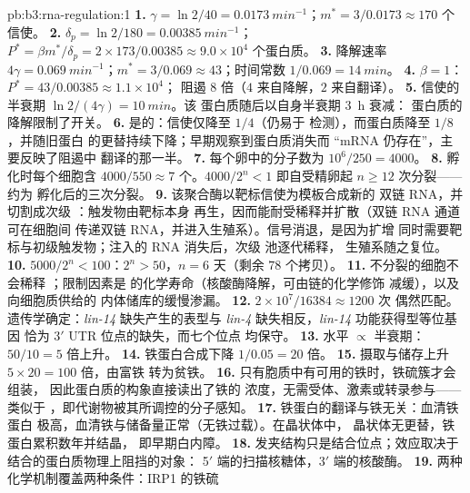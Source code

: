 \begin{solution}{pb:b3:rna-regulation:1}
\textbf{1.} $\gamma = \ln 2/40 = \qty{0.0173}{min^{-1}}$；$m^{*} =
3/0.0173 \approx 170$ 个信使。
\textbf{2.} $\delta_{p} = \ln 2/180 = \qty{0.00385}{min^{-1}}$；$P^{*} =
\beta m^{*}/\delta_{p} = 2\times 173/0.00385 \approx 9.0\times 10^{4}$
个蛋白质。
\textbf{3.} 降解速率 $4\gamma = \qty{0.069}{min^{-1}}$；$m^{*} = 3/0.069
\approx 43$；时间常数 $1/0.069 = \qty{14}{min}$。
\textbf{4.} $\beta = 1$：$P^{*} = 43/0.00385 \approx 1.1\times 10^{4}$；
阻遏 $8$ 倍（$4$ 来自降解，$2$ 来自翻译）。
\textbf{5.} 信使的半衰期 $\ln 2/(4\gamma) = \qty{10}{min}$。该
蛋白质随后以自身半衰期 \qty{3}{h} 衰减：
蛋白质的降解限制了开关。
\textbf{6.} 是的：信使仅降至 $1/4$（仍易于
检测），而蛋白质降至 $1/8$，并随旧蛋白
的更替持续下降；早期观察到蛋白质消失而
“mRNA 仍存在”，主要反映了阻遏中
翻译的那一半。
\textbf{7.} 每个卵中的分子数为 $10^{6}/250 = 4000$。
\textbf{8.} 孵化时每个细胞含 $4000/550 \approx 7$ 个。$4000/2^{n} < 1$
即自受精卵起 $n \ge 12$ 次分裂——约为
孵化后的三次分裂。
\textbf{9.} 该聚合酶以靶标信使为模板合成新的
双链 RNA，并切割成次级 ：触发物由靶标本身
再生，因而能耐受稀释并扩散（双链 RNA 通道可在细胞间
传递双链 RNA，并进入生殖系）。信号消退，是因为扩增
同时需要靶标与初级触发物；注入的 RNA 消失后，次级
 池逐代稀释，
生殖系随之复位。
\textbf{10.} $5000/2^{n} < 100$：$2^{n} > 50$，$n = 6$ 天（剩余 $78$
个拷贝）。
\textbf{11.} 不分裂的细胞不会稀释 ；限制因素是
 的化学寿命（核酸酶降解，可由链的化学修饰
减缓），以及向细胞质供给的
内体储库的缓慢渗漏。
\textbf{12.} $2\times 10^{7}/\num{16384} \approx \num{1200}$ 次
偶然匹配。遗传学确定：\emph{lin-14} 缺失产生的表型与
\emph{lin-4} 缺失相反，\emph{lin-14} 功能获得型等位基因
恰为 3$'$ UTR 位点的缺失，而七个位点
均保守。
\textbf{13.} 水平 $\propto$ 半衰期：$50/10 = 5$ 倍上升。
\textbf{14.} 铁蛋白合成下降 $1/0.05 = 20$ 倍。
\textbf{15.} 摄取与储存上升 $5\times 20 = 100$ 倍，由富铁
转为贫铁。
\textbf{16.} 只有胞质中有可用的铁时，铁硫簇才会组装，
因此蛋白质的构象直接读出了铁的
浓度，无需受体、激素或转录参与——类似于
，即代谢物被其所调控的分子感知。
\textbf{17.} 铁蛋白的翻译与铁无关：血清铁蛋白
极高，血清铁与储备量正常（无铁过载）。在晶状体中，
晶状体无更替，铁蛋白累积数年并结晶，
即早期白内障。
\textbf{18.} 发夹结构只是结合位点；效应取决于
结合的蛋白质物理上阻挡的对象：
5$'$ 端的扫描核糖体，3$'$ 端的核酸酶。
\textbf{19.} 两种化学机制覆盖两种条件：IRP1 的铁硫

\end{solution}

